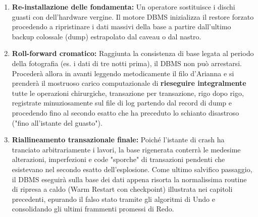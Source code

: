 \begin{enumerate}
    \item \textbf{Re-installazione delle fondamenta:} Un operatore sostituisce i dischi guasti con dell'hardware vergine. Il motore DBMS inizializza il restore forzato procedendo a ripristinare i dati massivi della base a partire dall'ultimo backup colossale (dump) estrapolato dal caveau o dal nastro.
    \item \textbf{Roll-forward cromatico:} Raggiunta la consistenza di base legata al periodo della fotografia (es. i dati di tre notti prima), il DBMS non può arrestarsi. Procederà allora in avanti leggendo metodicamente il filo d'Arianna e si prenderà il mostruoso carico computazionale di \textbf{rieseguire integralmente} tutte le operazioni chirurgiche, transazione per transazione, rigo dopo rigo, registrate minuziosamente sul file di log partendo dal record di dump e procedendo fino al secondo esatto che ha preceduto lo schianto disastroso ("fino all'istante del guasto").
    \item \textbf{Riallineamento transazionale finale:} Poiché l'istante di crash ha tranciato arbitrariamente i lavori, la base rigenerata conterrà le medesime alterazioni, imperfezioni e code "sporche" di transazioni pendenti che esistevano nel secondo esatto dell'esplosione. Come ultimo salvifico passaggio, il DBMS eseguirà sulla base dei dati appena risorta la normalissima routine di ripresa a caldo (Warm Restart con checkpoint) illustrata nei capitoli precedenti, epurando il falso stato tramite gli algoritmi di Undo e consolidando gli ultimi frammenti promessi di Redo.
\end{enumerate}
